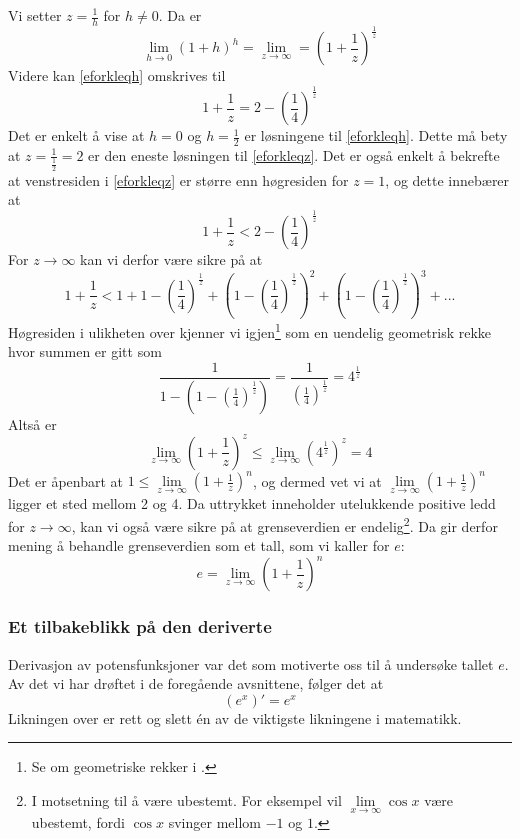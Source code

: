 Vi setter $z=\frac{1}{h} $ for $ h\neq0 $. Da er
\[ \lim\limits_{h\to 0} (1+h)^h=\lim\limits_{z\to\infty}=\left(1+\frac{1}{z}\right)^\frac{1}{z} \]
Videre kan \eqref{eforkleqh} omskrives til
\begin{equation}\label{eforkleqz}
	1+\frac{1}{z}=2-\left(\frac{1}{4}\right)^\frac{1}{z}
\end{equation}
Det er enkelt å vise at $ h=0 $ og $ h=\frac{1}{2} $ er løsningene til \eqref{eforkleqh}. Dette må bety at $ z=\frac{1}{\frac{1}{2}}=2 $ er den eneste løsningen til \eqref{eforkleqz}. Det er også enkelt å bekrefte at venstresiden i \eqref{eforkleqz} er større enn høgresiden for $ z=1 $, og dette innebærer at
\[ 1+\frac{1}{z}<2-\left(\frac{1}{4}\right)^\frac{1}{z} \]
For $ z\to\infty $ kan vi derfor være sikre på at
\[ 1+\frac{1}{z}<1+1-\left(\frac{1}{4}\right)^\frac{1}{z}+\left(1-\left(\frac{1}{4}\right)^\frac{1}{z}\right)^2+\left(1-\left(\frac{1}{4}\right)^\frac{1}{z}\right)^3+... \]
Høgresiden i ulikheten over kjenner vi igjen\footnote{Se om geometriske rekker i \tmto.} som en uendelig geometrisk rekke hvor summen er gitt som
\[ \frac{1}{1-\left(1-\left(\frac{1}{4}\right)^\frac{1}{z}\right)} =\frac{1}{\left(\frac{1}{4}\right)^\frac{1}{z}}=4^\frac{1}{z} \]
Altså er
\begin{equation}\label{eforkllim4}
	\lim\limits_{z\to\infty}\left(1+\frac{1}{z}\right)^z\leq \lim\limits_{z\to\infty}\left(4^\frac{1}{z}\right)^z=4
\end{equation}
Det er åpenbart at $ 1\leq\lim\limits_{z\to\infty }\left(1+\frac{1}{z}\right)^n$,
og dermed vet vi at $ \lim\limits_{z\to\infty }\left(1+\frac{1}{z}\right)^n $ ligger et sted mellom 2 og 4.
Da uttrykket inneholder utelukkende positive ledd for $ {z\to\infty} $, kan vi også være sikre på at grenseverdien er endelig\footnote{I motsetning til å være ubestemt. For eksempel vil $ \lim\limits_{x\to \infty} \cos x $  være ubestemt, fordi $ \cos x $ svinger mellom $ -1 $ og $ 1 $.}. Da gir derfor mening å behandle grenseverdien som et tall, som vi kaller for $ e $:
\[ e=\lim\limits_{z\to\infty }\left(1+\frac{1}{z}\right)^n  \]
\subsubsection{Et tilbakeblikk på den deriverte}
Derivasjon av potensfunksjoner var det som motiverte oss til å undersøke tallet $ e $. Av det vi har drøftet i de foregående avsnittene, følger det at
\[ \left(e^x\right)'=e^x \]
Likningen over er rett og slett én av de viktigste likningene i matematikk.
